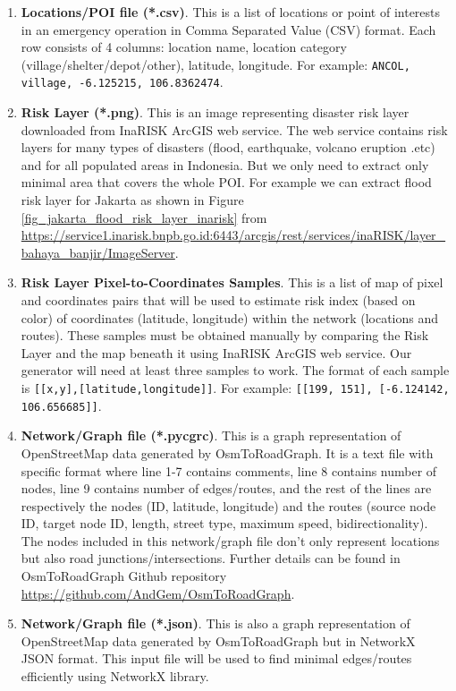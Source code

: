 \documentclass[conference]{IEEEtran}
\begin{document}
\begin{enumerate}

\item \textbf{Locations/POI file (*.csv)}. This is a list of locations or point of interests in an emergency operation in Comma Separated Value (CSV) format. Each row consists of 4 columns: location name, location category (village/shelter/depot/other), latitude, longitude. For example: \texttt{ANCOL, village, -6.125215, 106.8362474}.

\item \textbf{Risk Layer (*.png)}. This is an image representing disaster risk layer downloaded from InaRISK\cite{Bnpb2016Inarisk} ArcGIS web service. The web service contains risk layers for many types of disasters (flood, earthquake, volcano eruption .etc) and for all populated areas in Indonesia. But we only need to extract only minimal area that covers the whole POI. For example we can extract flood risk layer for Jakarta as shown in Figure \ref{fig_jakarta_flood_risk_layer_inarisk} from \url{https://service1.inarisk.bnpb.go.id:6443/arcgis/rest/services/inaRISK/layer_bahaya_banjir/ImageServer}.

\item \textbf{Risk Layer Pixel-to-Coordinates Samples}. This is a list of map of pixel and coordinates pairs that will be used to estimate risk index (based on color) of coordinates (latitude, longitude) within the network (locations and routes). These samples must be obtained manually by comparing the Risk Layer and the map beneath it using InaRISK ArcGIS web service. Our generator will need at least three samples to work. The format of each sample is \texttt{[[x,y],[latitude,longitude]]}. For example: \texttt{[[199, 151], [-6.124142, 106.656685]]}.

\item \textbf{Network/Graph file (*.pycgrc)}. This is a graph representation of OpenStreetMap data generated by OsmToRoadGraph\cite{Gemsa2017OsmToRoadGraph}. It is a text file with specific format where line 1-7 contains comments, line 8 contains number of nodes, line 9 contains number of edges/routes, and the rest of the lines are respectively the nodes (ID, latitude, longitude) and the routes (source node ID, target node ID, length, street type, maximum speed, bidirectionality). The nodes included in this network/graph file don't only represent locations but also road junctions/intersections. Further details can be found in OsmToRoadGraph Github repository \url{https://github.com/AndGem/OsmToRoadGraph}.

\item \textbf{Network/Graph file (*.json)}. This is also a graph representation of OpenStreetMap data generated by OsmToRoadGraph\cite{Gemsa2017OsmToRoadGraph} but in NetworkX\cite{SciPyProceedings_11} JSON format. This input file will be used to find minimal edges/routes efficiently using NetworkX library.

\end{enumerate}
\end{document}
